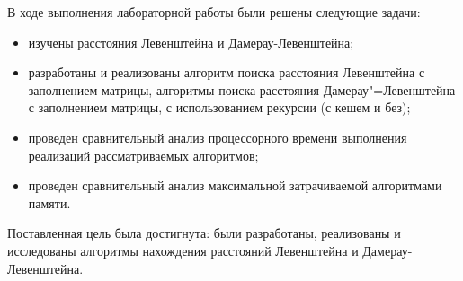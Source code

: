 \vspace{\baselineskip}

В ходе выполнения лабораторной работы были решены следующие задачи:

\begin{itemize}
    \item изучены расстояния Левенштейна и Дамерау-Левенштейна;
	\item разработаны и реализованы алгоритм поиска расстояния Левенштейна с заполнением матрицы, алгоритмы поиска расстояния Дамерау"=Левенштейна с заполнением матрицы, с использованием рекурсии (с кешем и без);
	\item проведен сравнительный анализ процессорного времени выполнения реализаций рассматриваемых алгоритмов;
	\item проведен сравнительный анализ максимальной затрачиваемой алгоритмами памяти.
\end{itemize}

Поставленная цель была достигнута: были разработаны, реализованы и исследованы алгоритмы нахождения расстояний Левенштейна и Дамерау-\newline Левенштейна.